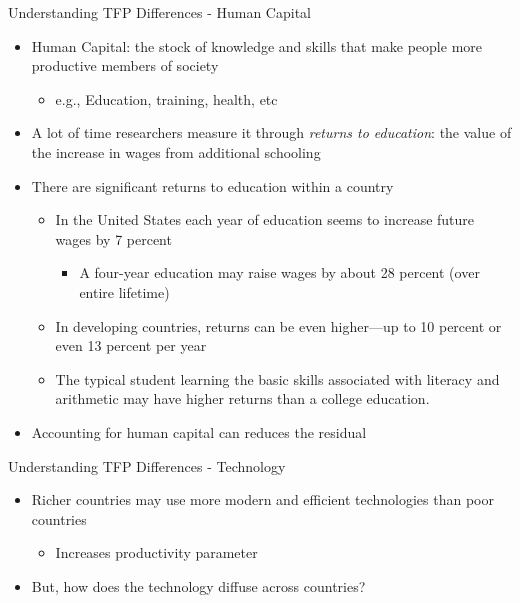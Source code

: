 \documentclass[aspectratio=1610]{beamer}
\begin{document}
\begin{frame}[wide]{Understanding TFP Differences - Human Capital}
	\begin{itemize}
		\item Human Capital: the stock of knowledge and skills that make people more productive members of society
		\begin{itemize}
			\item e.g., Education, training, health, etc
		\end{itemize}		
		\item A lot of time researchers measure it through \textit{returns to education}: the value of the increase in wages from additional schooling
		\item There are significant returns to education within a country
		\begin{itemize}
			\item In the United States each year of education seems to increase future wages by 7 percent
			\begin{itemize}
				\item A four-year education may raise wages by about 28 percent (over entire lifetime)
			\end{itemize}
			\item In developing countries, returns can be even higher—up to 10 percent or even 13 percent per year
			\item The typical student learning the basic skills associated with literacy and arithmetic may have higher returns than a college education.
		\end{itemize}
		\item Accounting for human capital can reduces the residual 
	\end{itemize}
\end{frame}

\begin{frame}[wide]{Understanding TFP Differences - Technology}
	\begin{itemize}
		\item 	Richer countries may use more modern and efficient technologies than poor countries
		\begin{itemize}
			\item Increases productivity parameter
		\end{itemize}
		\item But, how does the technology diffuse across countries?
	\end{itemize}
\end{frame}
\end{document}
